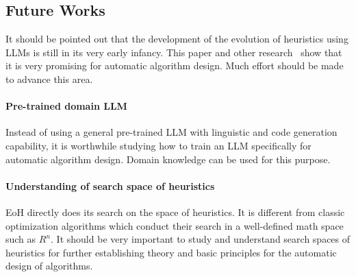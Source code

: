 \subsection{Future Works}




It should be pointed out that the development of the evolution of heuristics using LLMs is still in its very early infancy. This paper and other research~\cite{romera2024mathematical} show that it is very promising for automatic algorithm design. Much effort should be made to advance this area. 

\paragraph{Pre-trained domain LLM}
Instead of using a general pre-trained LLM with linguistic and code generation capability, it is worthwhile studying how to train an LLM specifically for automatic algorithm design. Domain knowledge can be used for this purpose.  


\paragraph{Understanding of search space of heuristics}
EoH directly does its search on the space of heuristics. It is different from classic optimization algorithms which conduct their search in a well-defined math space such as $R^n$. It should be very important to study and understand search spaces of heuristics for further establishing theory and basic principles for the automatic design of algorithms.  


